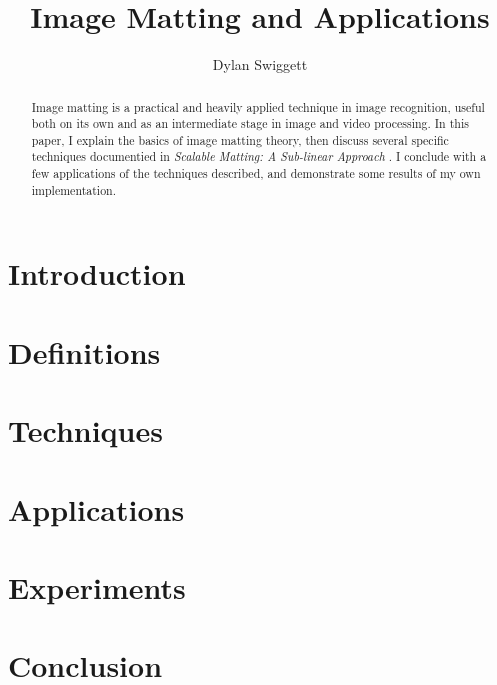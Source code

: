 \documentclass[10pt,a4paper]{article}
\author{Dylan Swiggett}
\title{Image Matting and Applications}
\begin{document}
\maketitle

\begin{abstract}
Image matting is a practical and heavily applied technique in image recognition, useful both on its own and as an intermediate stage in image and video processing. In this paper, I explain the basics of image matting theory, then discuss several specific techniques documentied in \textit{Scalable Matting: A Sub-linear Approach} \cite{lee14}. I conclude with a few applications of the techniques described, and demonstrate some results of my own implementation.
\end{abstract}

\tableofcontents
\pagebreak

\iffalse
\pagestyle{empty}
\begin{quote}
\item
\end{quote}
\pagebreak
\setcounter{page}{2}
\pagestyle{plain}
\fi

\section{Introduction}

\section{Definitions}

\section{Techniques}

\section{Applications}

\section{Experiments}

\section{Conclusion}


\pagebreak

\end{document}
